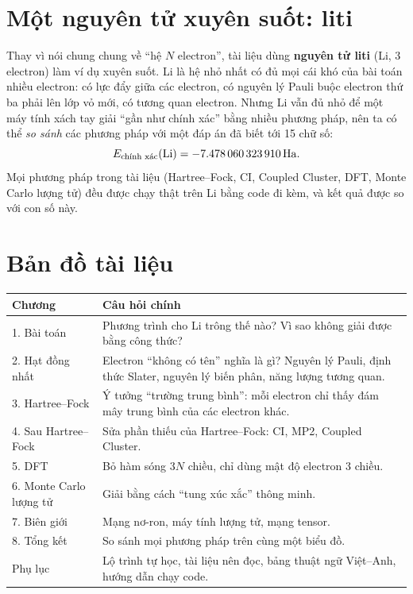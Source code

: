 \section*{Một nguyên tử xuyên suốt: liti}
Thay vì nói chung chung về ``hệ $N$ electron'', tài liệu dùng \textbf{nguyên tử liti} (Li, 3 electron) làm ví dụ xuyên suốt. Li là hệ nhỏ nhất có đủ mọi cái khó của bài toán nhiều electron: có lực đẩy giữa các electron, có nguyên lý Pauli buộc electron thứ ba phải lên lớp vỏ mới, có tương quan electron. Nhưng Li vẫn đủ nhỏ để một máy tính xách tay giải ``gần như chính xác'' bằng nhiều phương pháp, nên ta có thể \emph{so sánh} các phương pháp với một đáp án đã biết tới 15 chữ số:
\[
E_{\text{chính xác}}(\text{Li}) = -7.478\,060\,323\,910\,\mathrm{Ha} .
\]
Mọi phương pháp trong tài liệu (Hartree--Fock, CI, Coupled Cluster, DFT, Monte Carlo lượng tử) đều được chạy thật trên Li bằng code đi kèm, và kết quả được so với con số này.

\section*{Bản đồ tài liệu}
\begin{center}
\small
\begin{tabularx}{\textwidth}{@{}lX@{}}
\toprule
\textbf{Chương} & \textbf{Câu hỏi chính} \\
\midrule
1. Bài toán & Phương trình cho Li trông thế nào? Vì sao không giải được bằng công thức? \\
2. Hạt đồng nhất & Electron ``không có tên'' nghĩa là gì? Nguyên lý Pauli, định thức Slater, nguyên lý biến phân, năng lượng tương quan. \\
3. Hartree--Fock & Ý tưởng ``trường trung bình'': mỗi electron chỉ thấy đám mây trung bình của các electron khác. \\
4. Sau Hartree--Fock & Sửa phần thiếu của Hartree--Fock: CI, MP2, Coupled Cluster. \\
5. DFT & Bỏ hàm sóng $3N$ chiều, chỉ dùng mật độ electron 3 chiều. \\
6. Monte Carlo lượng tử & Giải bằng cách ``tung xúc xắc'' thông minh. \\
7. Biên giới & Mạng nơ-ron, máy tính lượng tử, mạng tensor. \\
8. Tổng kết & So sánh mọi phương pháp trên cùng một biểu đồ. \\
Phụ lục & Lộ trình tự học, tài liệu nên đọc, bảng thuật ngữ Việt--Anh, hướng dẫn chạy code. \\
\bottomrule
\end{tabularx}
\end{center}


